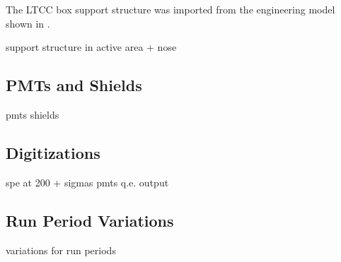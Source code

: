 The LTCC box support structure was imported from the engineering model shown in .


support structure in active area  + nose

\subsection{PMTs and Shields}

pmts shields

\subsection{Digitizations}

spe at 200 + sigmas
pmts q.e.
output

\subsection{Run Period Variations}


variations for run periods



